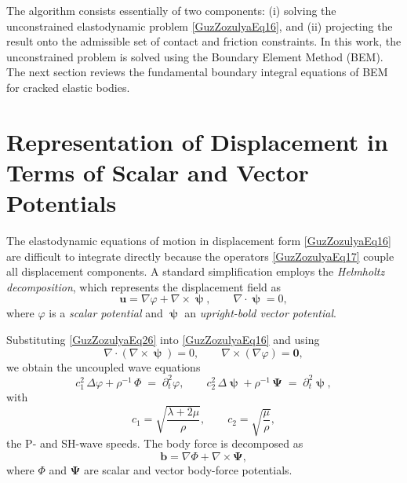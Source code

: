 The algorithm consists essentially of two components:  
(i) solving the unconstrained elastodynamic problem \eqref{GuzZozulyaEq16}, and  
(ii) projecting the result onto the admissible set of contact and friction constraints.  
In this work, the unconstrained problem is solved using the Boundary Element Method (BEM).  
The next section reviews the fundamental boundary integral equations of BEM for cracked elastic bodies.

\section{Representation of Displacement in Terms of Scalar and Vector Potentials}

The elastodynamic equations of motion in displacement form
\eqref{GuzZozulyaEq16} are difficult to integrate directly because the
operators \eqref{GuzZozulyaEq17} couple all displacement components.  A
standard simplification employs the \emph{Helmholtz decomposition}, which
represents the displacement field as
\cite{GuzZozulyaRef1,GuzZozulyaRef15,GuzZozulyaRef18}
\begin{equation}\label{GuzZozulyaEq26}
	\mathbf{u} = \nabla \varphi + \nabla \times \bm{\uppsi},
	\qquad
	\nabla \cdot \bm{\uppsi} = 0,
\end{equation}
where $\varphi$ is a \emph{scalar potential} and
$\bm{\uppsi}$ an \emph{upright-bold vector potential}.

Substituting \eqref{GuzZozulyaEq26} into
\eqref{GuzZozulyaEq16} and using
\begin{equation}\label{GuzZozulyaEq27}
\nabla \cdot (\nabla \times \bm{\uppsi}) = 0,
\qquad
\nabla \times (\nabla \varphi) = \mathbf{0},
\end{equation}
we obtain the uncoupled wave equations
\begin{equation}\label{GuzZozulyaEq28}
	c_1^{2}\,\Delta\varphi + \rho^{-1}\,\Phi
	\;=\;
	\partial_{t}^{2}\varphi,
	\qquad
	c_2^{2}\,\Delta\bm{\uppsi} + \rho^{-1}\,\boldsymbol{\Psi}
	\;=\;
	\partial_{t}^{2}\bm{\uppsi},
\end{equation}
with
\[
c_1 = \sqrt{\frac{\lambda+2\mu}{\rho}},
\qquad
c_2 = \sqrt{\frac{\mu}{\rho}},
\]
the P- and SH-wave speeds.  The body force is decomposed as
\begin{equation}\label{GuzZozulyaEq29}
	\mathbf{b} = \nabla\Phi + \nabla \times \boldsymbol{\Psi},
\end{equation}
where $\Phi$ and $\boldsymbol{\Psi}$ are scalar and vector body-force
potentials.


